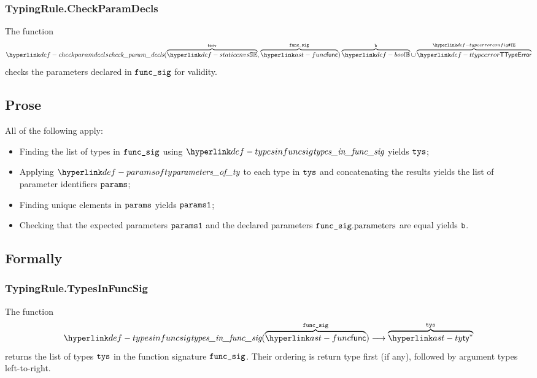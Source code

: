 \subsubsection{TypingRule.CheckParamDecls \label{sec:TypingRule.CheckParamDecls}}
The function
\[
\checkparamdecls(\overname{\staticenvs}{\tenv}, \overname{\func}{\funcsig}) \overname{\Bool}{\vb} \cup \overname{\TTypeError}{\TypeErrorConfig}
\]
checks the parameters declared in $\funcsig$ for validity.

\subsection{Prose}
All of the following apply:
\begin{itemize}
  \item Finding the list of types in $\funcsig$ using $\typesinfuncsig$ yields $\tys$;
  \item Applying $\paramsofty$ to each type in $\tys$ and concatenating the results yields the list of parameter identifiers $\params$;
  \item Finding unique elements in $\params$ yields $\paramsone$;
  \item Checking that the expected parameters $\paramsone$ and the declared parameters $\funcsig.\funcparameters$ are equal yields $\vb$\ProseOrTypeError.
\end{itemize}

\subsection{Formally}
\begin{mathpar}
\end{mathpar}

\subsubsection{TypingRule.TypesInFuncSig \label{sec:TypingRule.TypesInFuncSig}}
\hypertarget{def-typesinfuncsig}{}
The function
\[
\typesinfuncsig(\overname{\func}{\funcsig}) \aslto \overname{\ty^*}{\tys}
\]
returns the list of types $\tys$ in the function signature $\funcsig$.
Their ordering is return type first (if any), followed by argument types left-to-right.

